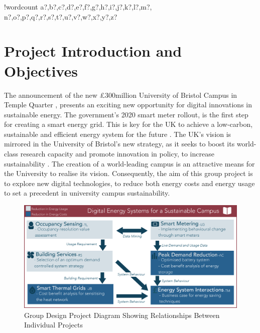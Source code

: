 \documentclass[fontsize=9.5pt]{extarticle}
\numberwithin{figure}{section} %
\newcounter{words}
\newenvironment{counted}{%
  \setcounter{words}{0}
  \SearchList!{wordcount}{\stepcounter{words}}
    {a?,b?,c?,d?,e?,f?,g?,h?,i?,j?,k?,l?,m?,
    n?,o?,p?,q?,r?,s?,t?,u?,v?,w?,x?,y?,z?}
  \UndoBoundary{'}
  \SearchOrder{p;}}{%
  \StopSearching}
\begin{document}
\clearpage
\cfoot{\thepage}
\begin{counted} %
\section{Project Introduction and
Objectives}\label{project-introduction-and-objectives}

The announcement of the new £300million University of Bristol Campus in
Temple Quarter \cite{November58:online}, presents an exciting new
opportunity for digital innovations in sustainable energy. The
government's 2020 smart meter rollout, is the first step for creating a
smart energy grid. This is key for the UK to achieve a low-carbon,
sustainable and efficient energy system for the future
\cite{SmartEne79:online}. The UK's vision is mirrored in the University
of Bristol's new strategy, as it seeks to boost its world-class research
capacity and promote innovation in policy, to increase sustainability
\cite{universi93:online}. The creation of a world-leading campus is an
attractive means for the University to realise its vision. Consequently,
the aim of this group project is to explore new digital technologies, to
reduce both energy costs and energy usage to set a precedent in
university campus sustainability.

\begin{figure}[H]
\centering
\includegraphics[width=1\textwidth]{GroupDiav2.eps}
\caption{Group Design Project Diagram Showing Relationships Between Individual Projects}
\vspace{-20pt}
\label{groupDia}
\end{figure}


\end{counted}
\end{document}
